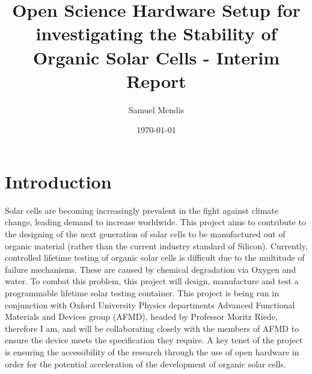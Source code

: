 \documentclass[a4paper,11pt]{article}
\begin{document}
\title{Open Science Hardware Setup for investigating the Stability of Organic Solar Cells - Interim Report}
\author{Samuel Mendis}
\date{\today}
\maketitle
\pagebreak
\section{Introduction}
Solar cells are becoming increasingly prevalent in the fight against climate change\cite[p.~XV]{RN45}, leading demand to increase worldwide. This project aims to contribute to the designing of the next generation of solar cells to be manufactured out of organic material (rather than the current industry standard of Silicon). Currently, controlled lifetime testing of organic solar cells is difficult due to the multitude of failure mechanisms. These are caused by chemical degradation via Oxygen and water\cite[p.~689]{RN38}. To combat this problem, this project will design, manufacture and test a programmable lifetime solar testing container. This project is being run in conjunction with Oxford University Physics departments  Advanced Functional Materials and Devices group (AFMD), headed by Professor Moritz Riede, therefore I am, and will be collaborating closely with the members of AFMD to ensure the device meets the specification they require. A key tenet of the project is ensuring the accessibility of the research through the use of open hardware in order for the  potential acceleration of the development of organic solar cells.
\end{document}
